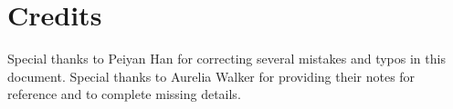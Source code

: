\section{Credits}

Special thanks to Peiyan Han for correcting several mistakes and typos in this document. Special thanks to Aurelia Walker for providing their notes for reference and to complete missing details.